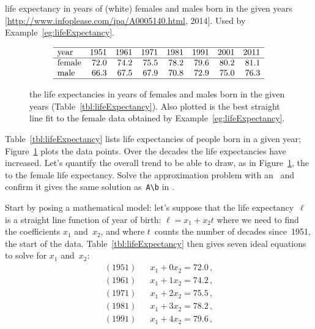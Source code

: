\begin{example} \label{eg:lifeExpectancy}
\begin{table}
\caption{life expectancy in years of (white) females and males born in the given years  [\url{http://www.infoplease.com/ipa/A0005140.html}, 2014].  Used by Example~\ref{eg:lifeExpectancy}.}
\label{tbl:lifeExpectancy}
\begin{equation*}
\begin{array}{lrrrrrrrr} \hline
\text{year}&1951&1961&1971&1981&1991&2001&2011\\\hline
\text{female}&72.0&74.2&75.5&78.2&79.6&80.2&81.1\\
\text{male}&66.3&67.5&67.9&70.8&72.9&75.0&76.3\\\hline
\end{array}
\end{equation*}
\end{table}
\begin{figure}
\centering

\caption{the life expectancies in years of females and males born in the given years (Table~\ref{tbl:lifeExpectancy}).  Also plotted is the best straight line fit to the female data obtained by Example~\ref{eg:lifeExpectancy}.}
\label{fig:lifeExpectancy}
\end{figure}
Table~\ref{tbl:lifeExpectancy} lists life expectancies of people born in a given year; Figure~\ref{fig:lifeExpectancy} plots the data points.
Over the decades the life expectancies have increased.
Let's quantify the overall trend to be able to draw, as in Figure~\ref{fig:lifeExpectancy}, the  to the female life expectancy.
Solve the approximation problem with an \svd\ and confirm it gives the same solution as~\verb|A\b| in \script.
\begin{solution} 
Start by posing a mathematical model: let's suppose that the life expectancy~\(\ell\) is a straight line function of year of birth: \(\ell=x_1+x_2t\) where we need to find the coefficients \(x_1\) and~\(x_2\), and where \(t\)~counts the number of decades since~1951, the start of the data.
Table~\ref{tbl:lifeExpectancy} then gives seven ideal equations to solve for \(x_1\) and~\(x_2\):
\begin{eqnarray*}
(1951)&&x_1+0x_2=72.0\,,
\\(1961)&&x_1+1x_2=74.2\,,
\\(1971)&&x_1+2x_2=75.5\,,
\\(1981)&&x_1+3x_2=78.2\,,
\\(1991)&&x_1+4x_2=79.6\,,

\end{eqnarray*}
\end{solution}
\end{example}
